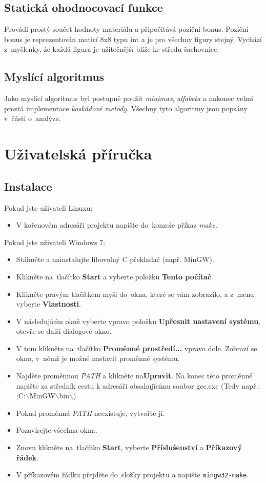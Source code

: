 \documentclass[11pt, titlepage]{article}
\begin{document}
\subsection{Statická ohodnocovací funkce}
Provádí prostý součet hodnoty materiálu a připočítává poziční bonus. Poziční bonus je reprezentován maticí 8x8 typu int a je pro všechny figury stejný. Vychází z~myšlenky, že každá figura je užitečnější blíže ke středu šachovnice.

\subsection{Myslící algoritmus}
Jako myslící algoritmus byl postupně použit {\it minimax}, {\it alfabeta} a nakonec velmi prostá implementace {\it kaskádové metody}. Všechny tyto algoritmy jsou popsány v~části o~analýze.

\section{Uživatelská příručka}

\subsection{Instalace}

Pokud jste uživateli Linuxu:
\begin{itemize}
	\item V kořenovém adresáři projektu napište do~konzole příkaz {\it make}.
\end{itemize}
Pokud jste uživateli Windows 7:
\begin{itemize}
	\item Stáhněte a nainstalujte libovolný C překladač (např. MinGW).
	\item Klikněte na~tlačítko {\bf Start} a vyberte položku {\bf Tento počítač}.
	\item Klikněte pravým tlačítkem myši do~okna, které se vám zobrazilo, a z~menu vyberte {\bf Vlastnosti}.
	\item V následujícím okně vyberte vpravo položku {\bf Upřesnit nastavení systému}, otevře se další dialogové okno.
	\item V tom klikněte na~tlačítko {\bf Proměnné prostředí...} vpravo dole. Zobrazí se okno, v~němž je možné nastavit proměnné systému.
	\item Najděte proměnnou {\it PATH} a klikněte na{\bf Upravit}. Na konec této proměnné napište za středník cestu k adresáři obsahujícímu soubor gcc.exe (Tedy např.: ;C:$\backslash$MinGW$\backslash$bin$\backslash$)
	\item Pokud proměnná {\it PATH} neexistuje, vytvořte ji.
	\item Pozavírejte všechna okna.
	\item Znovu klikněte na~tlačítko {\bf Start}, vyberte {\bf Příslušenství} a {\bf Příkazový řádek}.
	\item V příkazovém řádku přejděte do~složky projektu a napište {\tt mingw32-make}.
\end{itemize}
\end{document}
